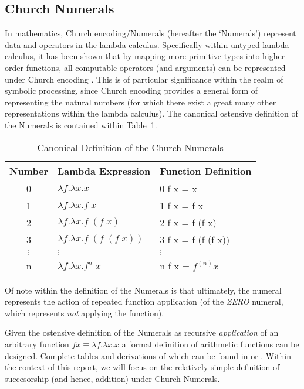 \documentclass{report}
\begin{document}
\subsection{Church Numerals}
\label{sec:church_numerals}

In mathematics, Church encoding/Numerals (hereafter the \lq{}Numerals\rq{}) represent data and operators in the lambda calculus.
Specifically within untyped lambda calculus, it has been shown that by mapping more primitive types into higher-order functions, all computable operators (and arguments) can be represented under Church encoding \cite{sep-lambda-calculus}.
This is of particular significance within the realm of symbolic processing, since Church encoding provides a general form of representing the natural numbers (for which there exist a great many other representations within the lambda calculus).
The canonical ostensive definition of the Numerals is contained within Table~\ref{tab:church_numerals}.

\begin{table}[H]
\centering
\begin{tabular}{c | l l}
	Number		&	Lambda Expression			& Function Definition\\ \hline
	0		& $\lambda f . \lambda x . x$ 		& 0 f x = x  \\
	1		& $\lambda f . \lambda x. f \; x$ 	& 1 f x = f x \\
	2		& $\lambda f . \lambda x .f \; (f \; x)$ & 2 f x = f (f x) \\
	3		& $\lambda f . \lambda x .f \; (f \;  (f \; x))$ & 3 f x = f (f (f x)) \\
	$\vdots$ & $\vdots$ & $\vdots$\\
	n 		& $ \lambda f.\lambda x.f^n\;x$ 	& n f x = $f^{(n)} x$\\
\end{tabular}
\caption{Canonical Definition of the Church Numerals}
\label{tab:church_numerals}
\end{table}

Of note within the definition of the Numerals is that ultimately, the numeral represents the action of repeated function application (of the \emph{ZERO} numeral, which represents \emph{not} applying the function).

Given the ostensive definition of the Numerals as recursive \emph{application} of an arbitrary function $f x \equiv \lambda f . \lambda x . x$ a formal definition of arithmetic functions can be designed.
Complete tables and derivations of which can be found in \cite{sep-lambda-calculus} or \cite{Kemp:2007}.
Within the context of this report, we will focus on the relatively simple definition of succesorship (and hence, addition) under Church Numerals.
\end{document}
